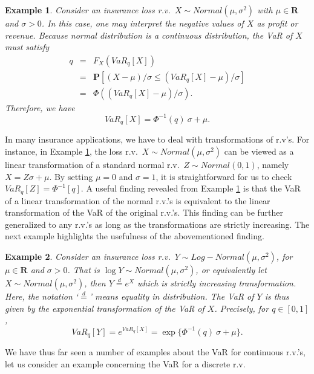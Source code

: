 \documentclass[12pt]{article}
\newtheorem{example}{\bf Example}
\begin{document}
\begin{example}
\label{exm:normal}
Consider an insurance loss r.v.\ $X\sim Normal(\mu,\sigma^2)$ with $\mu\in \mathbf{R}$ and $\sigma>0$.  In this case, one may interpret the negative values of $X$ as profit or revenue.  Because normal distribution is a continuous distribution, the VaR of $X$ must satisfy
\begin{eqnarray*}
 q &=& F_X(VaR_q[X])\\
&=&\mathbf{P}\left[(X-\mu)/\sigma\leq (VaR_q[X]-\mu)/\sigma\right]\\
&=&\Phi((VaR_q[X]-\mu)/\sigma).
\end{eqnarray*}
Therefore, we have
\[
VaR_q[X]=\Phi^{-1}(q)\ \sigma+\mu.
\]
\end{example}
In many insurance applications, we have to deal with transformations of r.v's.  For instance, in Example \ref{exm:normal}, the loss r.v.\ $X\sim Normal(\mu, \sigma^2)$ can be viewed as a linear transformation of a standard normal r.v.\ $Z\sim Normal(0,1)$, namely $X=Z\sigma+\mu$.  By setting $\mu=0$ and $\sigma=1$, it is straightforward for us to check $VaR_q[Z]=\Phi^{-1}[q].$  A useful finding revealed from Example \ref{exm:normal} is that the VaR of a linear transformation of the normal r.v.'s is equivalent to the linear transformation of the VaR of the original r.v.'s.  This finding can be further generalized to any r.v.'s as long as the transformations are strictly increasing.  The next example highlights the usefulness of the abovementioned finding.

\begin{example}
  Consider an insurance loss r.v.\ $Y\sim Log-Normal(\mu,\sigma^2)$, for $\mu\in \mathbf{R}$ and $\sigma>0$.  That is $\log Y\sim Normal(\mu,\sigma^2)$, or equivalently let $X\sim Normal(\mu,\sigma^2)$, then $Y\overset{d}{=}e^{X}$ which is strictly increasing transformation.  Here, the notation `$\overset{d}{=}$' means equality in distribution.  The VaR of $Y$ is thus given by the exponential transformation of the VaR of $X$.  Precisely, for $q\in [0,1]$,
\[
VaR_{q}[Y]= e^{VaR_q[X]}=\exp\{\Phi^{-1}(q)\ \sigma+\mu\}.
\]
\end{example}

We have thus far seen a number of examples about the VaR for continuous r.v.'s, let us consider an example concerning the VaR for a discrete r.v.
\end{document}
